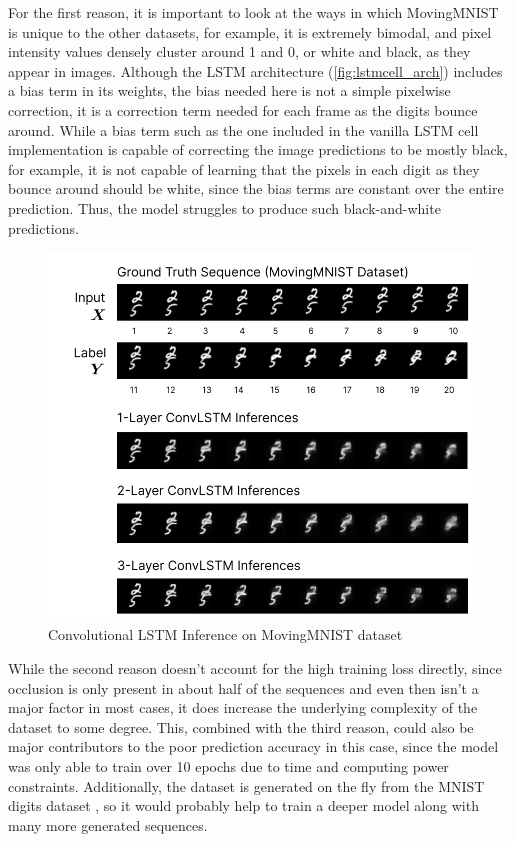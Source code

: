 \documentclass{scrartcl}
\begin{document}
For the first reason, it is important to look at the ways in which MovingMNIST
is unique to the other datasets, for example, it is extremely bimodal, and
pixel intensity values densely cluster around 1 and 0, or white and black, as
they appear in images. Although the LSTM architecture (\ref{fig:lstmcell_arch})
includes a bias term in its weights, the bias needed here is not a simple
pixelwise correction, it is a correction term needed for each frame as the
digits bounce around. While a bias term such as the one included in the vanilla
LSTM cell implementation is capable of correcting the image predictions to be
mostly black, for example, it is not capable of learning that the pixels in
each digit as they bounce around should be white, since the bias terms are
constant over the entire prediction. Thus, the model struggles to produce such
black-and-white predictions.

\begin{figure}[H]
	\begin{center}
		\includegraphics[width=1\textwidth]{inferences/mmnist/mmnist_inferences_1.png}
	\end{center}
	\caption{Convolutional LSTM Inference on MovingMNIST dataset}
	\label{inf:lstm_mmnist_inference_1}
\end{figure}

While the second reason doesn't account for the high training loss directly,
since occlusion is only present in about half of the sequences and even then
isn't a major factor in most cases, it does increase the underlying complexity
of the dataset to some degree. This, combined with the third reason, could also
be major contributors to the poor prediction accuracy in this case, since the
model was only able to train over 10 epochs due to time and computing power
constraints. Additionally, the dataset is generated on the fly from the MNIST
digits dataset \cite{mnist_digits}, so it would probably help to train a deeper
model along with many more generated sequences.
\end{document}
